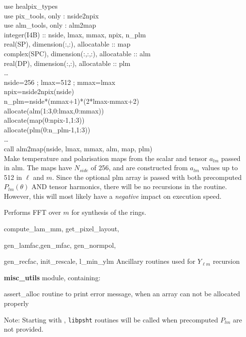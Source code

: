 \begin{example}
{
use healpix\_types \\
use pix\_tools, only : nside2npix \\
use alm\_tools, only : alm2map \\
integer(I4B) :: nside, lmax, mmax, npix, n\_plm\\
real(SP), dimension(:,:), allocatable :: map \\
complex(SPC), dimension(:,:,:), allocatable :: alm \\
real(DP), dimension(:,:), allocatable :: plm \\
\ldots \\
nside=256 ; lmax=512 ; mmax=lmax\\
npix=nside2npix(nside)\\
n\_plm=nside*(mmax+1)*(2*lmax-mmax+2)\\
allocate(alm(1:3,0:lmax,0:mmax))\\
allocate(map(0:npix-1,1:3))\\
allocate(plm(0:n\_plm-1,1:3))\\
\ldots \\
call alm2map(nside, lmax, mmax, alm, map, plm)  \\
}
{
Make temperature and polarisation maps from the scalar and tensor $a_{lm}$
passed in alm. The maps have $N_{side}$ of 256, and are constructed from
$a_{lm}$ values up to 512 in $\ell$ and $m$. Since the optional plm array is
passed with both precomputed $P_{lm}(\theta)$ AND tensor harmonics, there will
be no recursions in the routine. However, this will most likely have a
\emph{negative} impact on execution speed.
}
\end{example}

\begin{modules}
  \begin{sulist}{} %
  \item[\htmlref{ring\_synthesis}{sub:ring_synthesis}] Performs FFT over $m$ for synthesis of the rings.
  \item[compute\_lam\_mm, get\_pixel\_layout, ]
  \item[gen\_lamfac,gen\_mfac, gen\_normpol, ] 
  \item[gen\_recfac, init\_rescale, l\_min\_ylm] Ancillary routines used
  for $Y_{\ell m}$ recursion
  \item[\textbf{misc\_utils}] module, containing:
  \item[assert\_alloc] routine to print error message, when an array can not be
  allocated properly
  \end{sulist}
Note: Starting with , {\tt libpsht} routines will be called when
precomputed $P_{lm}$ are not provided.
\end{modules}

